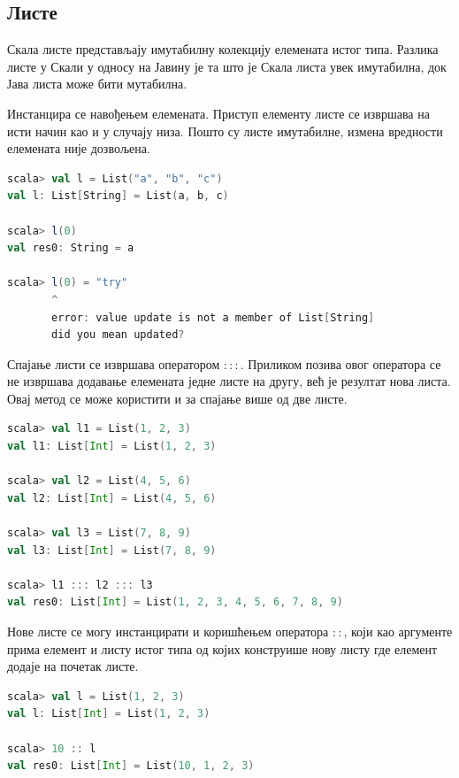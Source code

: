 \documentclass[12pt,oneside]{memoir}
\begin{document}
\subsection{Листе}
\label{subsec:scala_lists}

Скала листе представљају имутабилну колекцију елемената истог типа. Разлика листе у Скали у односу на Јавину је та што је Скала листа увек имутабилна, док Јава листа може бити мутабилна. 

Инстанцира се навођењем елемената. Приступ елементу листе се извршава на исти начин као и у случају низа. Пошто су листе имутабилне, измена вредности елемената није дозвољена. \cite{scala_prog}

\begin{lstlisting}[language=Scala, caption={Пример Скала листе}, label={lst:scala_coll_lists_example}]
scala> val l = List("a", "b", "c")
val l: List[String] = List(a, b, c)

scala> l(0)
val res0: String = a

scala> l(0) = "try"
       ^
       error: value update is not a member of List[String]
       did you mean updated?
\end{lstlisting}

Спајање листи се извршава оператором $:::$. Приликом позива овог оператора се не извршава додавање елемената једне листе на другу, већ је резултат нова листа. Овај метод се може користити и за спајање више од две листе. \cite{scala_prog}

\begin{lstlisting}[language=Scala, caption={Спајање листи}, label={lst:scala_coll_lists_new_list}]
scala> val l1 = List(1, 2, 3)
val l1: List[Int] = List(1, 2, 3)

scala> val l2 = List(4, 5, 6)
val l2: List[Int] = List(4, 5, 6)

scala> val l3 = List(7, 8, 9)
val l3: List[Int] = List(7, 8, 9)

scala> l1 ::: l2 ::: l3
val res0: List[Int] = List(1, 2, 3, 4, 5, 6, 7, 8, 9)
\end{lstlisting}

Нове листе се могу инстанцирати и коришћењем оператора $::$, који као аргументе прима елемент и листу истог типа од којих конструише нову листу где елемент додаје на почетак листе.

\begin{lstlisting}[language=Scala, caption={Пример оператора ::}, label={lst:scala_coll_lists_head_op}]
scala> val l = List(1, 2, 3)
val l: List[Int] = List(1, 2, 3)

scala> 10 :: l
val res0: List[Int] = List(10, 1, 2, 3)
\end{lstlisting}
\end{document}
